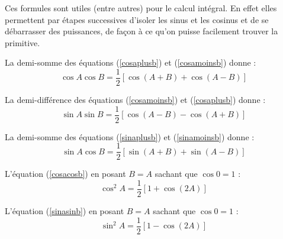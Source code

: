 Ces formules sont utiles (entre autres) pour le calcul intégral. En effet elles permettent par étapes successives d'isoler les sinus et les cosinus et de se débarrasser des puissances, de façon à ce qu'on puisse facilement trouver la primitive.

La demi-somme des équations (\ref{cosaplusb}) et (\ref{cosamoinsb}) donne :
\begin{equation}
\cos{A}\cos{B} = \frac{1}{2}[\cos(A+B)+\cos(A-B)]
\label{cosacosb}
\end{equation}

La demi-différence des équations (\ref{cosamoinsb}) et (\ref{cosaplusb}) donne :
\begin{equation}
\sin{A}\sin{B} = \frac{1}{2}[\cos(A-B)-\cos(A+B)]
\label{sinasinb}
\end{equation}

La demi-somme des équations (\ref{sinaplusb}) et (\ref{sinamoinsb}) donne :
\begin{equation}
\sin{A}\cos{B} = \frac{1}{2}[\sin(A+B) + \sin(A-B)]
\label{sinacosb}
\end{equation}

L'équation (\ref{cosacosb}) en posant $B=A$ sachant que $\cos 0 = 1$ :
\begin{equation}
\cos^2{A} = \frac{1}{2}[1+\cos(2A)]
\end{equation}

L'équation (\ref{sinasinb}) en posant $B=A$ sachant que $\cos 0 = 1$ :
\begin{equation}
\sin^2{A} = \frac{1}{2}[1-\cos(2A)]
\end{equation}